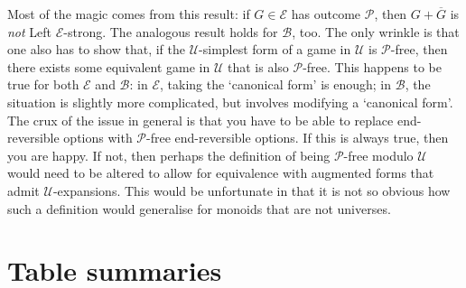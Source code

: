 \documentclass[11pt]{article}
\theoremstyle{definition}
\newcommand{\set}[1]{\mathcal{#1}}
\begin{document}
Most of the magic comes from this result: if $G\in\set{E}$ has outcome
$\mathscr{P}$, then $G+\overline{G}$ is \emph{not} Left $\set{E}$-strong. The
analogous result holds for $\set{B}$, too. The only wrinkle is that one also
has to show that, if the $\set{U}$-simplest form of a game in $\set{U}$ is
$\mathscr{P}$-free, then there exists some equivalent game in $\set{U}$ that is
also $\mathscr{P}$-free. This happens to be true for both $\set{E}$ and
$\set{B}$: in $\set{E}$, taking the `canonical form' is enough; in $\set{B}$,
the situation is slightly more complicated, but involves modifying a `canonical
form'. The crux of the issue in general is that you have to be able to replace
end-reversible options with $\mathscr{P}$-free end-reversible options. If this
is always true, then you are happy. If not, then perhaps the definition of
being $\mathscr{P}$-free modulo $\set{U}$ would need to be altered to allow for
equivalence with augmented forms that admit $\set{U}$-expansions. This would be
unfortunate in that it is not so obvious how such a definition would generalise
for monoids that are not universes.




\newpage

\appendix

\section{Table summaries}
\label{app:tables}
\end{document}
